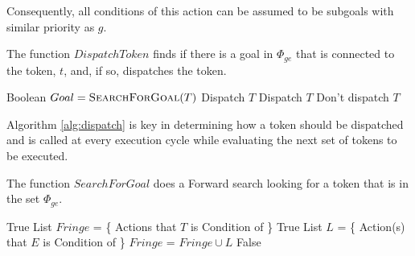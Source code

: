 Consequently, all conditions of this action can be assumed to be
subgoals with similar priority as $g$.

\begin{algorithm} [H]
  \caption{\small The function $DispatchToken$ finds if there is a
    goal in $\Phi_{ge}$ that is connected to the token, $t$, and, if
    so, dispatches the token.}
  \label{alg:dispatch}
\label{DispatchToken}
\begin{algorithmic}
\small 
{}
\State Boolean $Goal = \textsc{SearchForGoal}( T )$
	\State \Return Dispatch $T$
	\State \Return Dispatch $T$
\Else
	\State \Return Don't dispatch $T$
\EndIf
\EndFunction
\end{algorithmic}
\end{algorithm}

Algorithm \ref{alg:dispatch} is key in determining how a token should
be dispatched and is called at every execution cycle while evaluating
the next set of tokens to be executed.  %

\begin{algorithm} [htb]
  \caption{\small The function $SearchForGoal$ does a Forward search
    looking for a token that is in the set $\Phi_{ge}$.}
  \label{SearchForGoal}
\begin{algorithmic}
  \small
  \State \Return True
  \Else 
  \State List $Fringe$ = \{ Actions that $T$ is Condition of \}
  \State \Return True
  \Else 
  \State List $L$ = \{ Action(s) that $E$ is Condition of \}
  \State $Fringe$ = $Fringe \cup L$ 
  \EndIf
  \EndFor
  \EndFor
  \EndIf
  \State \Return False
\EndFunction
\end{algorithmic}
\end{algorithm}




